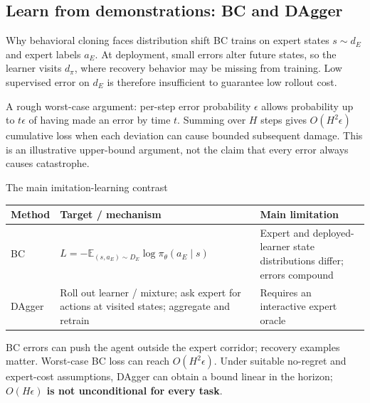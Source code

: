 \documentclass[10pt,a4paper]{article}
\newcommand{\E}{\mathbb E}
\begin{document}
\subsection{Learn from demonstrations: BC and DAgger}
\begin{card}{Why behavioral cloning faces distribution shift}
BC trains on expert states $s\sim d_E$ and expert labels $a_E$. At deployment, small errors alter future states, so the learner visits $d_\pi$, where recovery behavior may be missing from training. Low supervised error on $d_E$ is therefore insufficient to guarantee low rollout cost.

A rough worst-case argument: per-step error probability $\epsilon$ allows probability up to $t\epsilon$ of having made an error by time $t$. Summing over $H$ steps gives $O(H^2\epsilon)$ cumulative loss when each deviation can cause bounded subsequent damage. This is an illustrative upper-bound argument, not the claim that every error always causes catastrophe.
\end{card}

\begin{card}{The main imitation-learning contrast}
\small
\par\smallskip
\begin{tabularx}{\linewidth}{@{}P{1.6cm}Y Y@{}}
\toprule Method & Target / mechanism & Main limitation \\\midrule
BC & $L=-\E_{(s,a_E)\sim D_E}\log\pi_\theta(a_E\mid s)$ & Expert and deployed-learner state distributions differ; errors compound \\
DAgger & Roll out learner / mixture; ask expert for actions at visited states; aggregate and retrain & Requires an interactive expert oracle \\
\bottomrule
\end{tabularx}\par\smallskip
\normalsize
BC errors can push the agent outside the expert corridor; recovery examples matter. Worst-case BC loss can reach $O(H^2\epsilon)$. Under suitable no-regret and expert-cost assumptions, DAgger can obtain a bound linear in the horizon; \textbf{$O(H\epsilon)$ is not unconditional for every task}.
\end{card}
\end{document}

